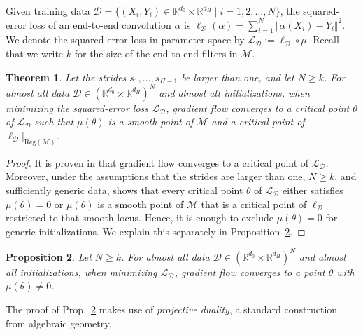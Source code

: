 \documentclass[twoside]{article}
\newtheorem{theorem}{Theorem}
\newtheorem{proposition}[theorem]{Proposition}
\theoremstyle{definition}
\theoremstyle{remark}
\begin{document}
Given training data $\mathcal{D} = \{  (X_i,Y_i) \in \mathbb{R}^{d_0} \times \mathbb{R}^{d_H} \mid i = 1,2, \ldots, N \}$, 
the squared-error loss of an end-to-end convolution $\alpha$ is 
$\ell_\mathcal{D}(\alpha) = \sum_{i=1}^N \Vert \alpha(X_i) - Y_i \Vert^2$.
We denote the squared-error loss in parameter space by $\mathcal{L}_\mathcal{D} :=  \ell_\mathcal{D} \circ \mu$.
Recall that we write $k$ for the size of the end-to-end filters in $\mathcal{M}$.

\begin{theorem}
    \label{thm:convergence}
    Let the strides $s_1, \ldots, s_{H-1}$ be larger than one, and let $N \geq k$.
    For almost all data $\mathcal{D} \in (\mathbb{R}^{d_0} \times \mathbb{R}^{d_H})^N$ and almost all initializations, when minimizing the squared-error loss $\mathcal{L}_\mathcal{D}$, gradient flow  converges to a critical point $\theta$ of $\mathcal{L}_\mathcal{D}$ such that $\mu(\theta)$ is a smooth point of $\mathcal{M}$ and a critical point of $\ell_\mathcal{D} |_{\mathrm{Reg}(\mathcal{M})}$. 
\end{theorem}
\begin{proof}
    It is proven in  
    \cite{dirati25} that gradient flow  converges to a critical point of $\mathcal{L}_\mathcal{D}$.
    Moreover, under the assumptions that the strides are larger than one, $N \geq k$, and sufficiently generic data, \cite[Theorem~2.12]{kohn2024function} shows that every critical point $\theta$ of $\mathcal{L}_\mathcal{D}$ either satisfies $\mu(\theta)=0$ or $\mu(\theta)$ is a smooth point of $\mathcal{M}$ that is a critical point of $\ell_\mathcal{D}$ restricted to that smooth locus.
    Hence, it is enough to exclude $\mu(\theta)=0$ for generic initializations. We explain this separately in Proposition~\ref{prop:exlude0}. 
\end{proof}

\begin{proposition}
    \label{prop:exlude0}
    Let $N \geq k $. For almost all data $\mathcal{D} \in (\mathbb{R}^{d_0} \times \mathbb{R}^{d_H})^N$ and almost all initializations, when minimizing  $\mathcal{L}_\mathcal{D}$, gradient flow  converges to a point $\theta$ with $\mu(\theta)\neq 0$.
\end{proposition}

The proof of Prop.~\ref{prop:exlude0} makes use of \emph{projective duality}, a standard construction from algebraic geometry.
\end{document}
